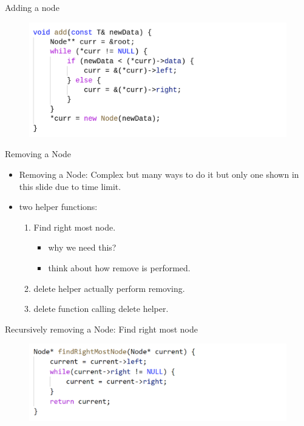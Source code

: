 \documentclass[aspectratio=169]{beamer}
\begin{document}
\begin{frame}{Adding a node}
        \begin{figure}
            \includegraphics[width=\textwidth]{BST_add.png}
    \end{figure}
\end{frame}

\begin{frame}{Removing a Node}
    \begin{itemize}
        \item Removing a Node: Complex but many ways to do it but only one shown in this slide due to time limit.
        \item two helper functions:
            \begin{enumerate}
                \item Find right most node. 
                    \begin{itemize}
                        \item why we need this?
                        \item think about how remove is performed.
                    \end{itemize}
                \item delete helper actually perform removing.
                \item delete function calling delete helper.
            \end{enumerate}
    \end{itemize}
\end{frame}

\begin{frame}{Recursively removing a Node:  Find right most node}
        \begin{figure}
            \includegraphics[width=\textwidth]{BST_FRM.png}
    \end{figure}
\end{frame}
\end{document}
